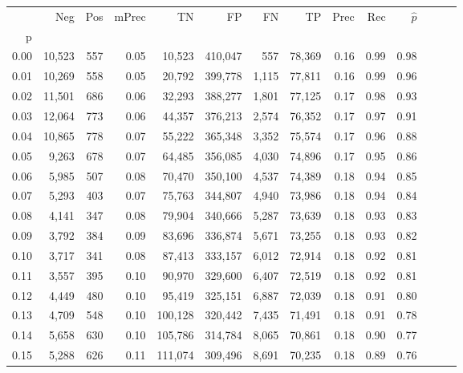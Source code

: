 \begin{tabular}{rrrrrrrrrrrrrr}
\toprule
{} &     Neg &    Pos & mPrec &       TN &       FP &      FN &      TP &  Prec &   Rec & $\hat{p}$ \\
p    &         &        &       &          &          &         &         &       &       &           \\
\midrule
0.00 &  10,523 &    557 &  0.05 &   10,523 &  410,047 &     557 &  78,369 &  0.16 &  0.99 &      0.98 \\
0.01 &  10,269 &    558 &  0.05 &   20,792 &  399,778 &   1,115 &  77,811 &  0.16 &  0.99 &      0.96 \\
0.02 &  11,501 &    686 &  0.06 &   32,293 &  388,277 &   1,801 &  77,125 &  0.17 &  0.98 &      0.93 \\
0.03 &  12,064 &    773 &  0.06 &   44,357 &  376,213 &   2,574 &  76,352 &  0.17 &  0.97 &      0.91 \\
0.04 &  10,865 &    778 &  0.07 &   55,222 &  365,348 &   3,352 &  75,574 &  0.17 &  0.96 &      0.88 \\
0.05 &   9,263 &    678 &  0.07 &   64,485 &  356,085 &   4,030 &  74,896 &  0.17 &  0.95 &      0.86 \\
0.06 &   5,985 &    507 &  0.08 &   70,470 &  350,100 &   4,537 &  74,389 &  0.18 &  0.94 &      0.85 \\
0.07 &   5,293 &    403 &  0.07 &   75,763 &  344,807 &   4,940 &  73,986 &  0.18 &  0.94 &      0.84 \\
0.08 &   4,141 &    347 &  0.08 &   79,904 &  340,666 &   5,287 &  73,639 &  0.18 &  0.93 &      0.83 \\
0.09 &   3,792 &    384 &  0.09 &   83,696 &  336,874 &   5,671 &  73,255 &  0.18 &  0.93 &      0.82 \\
0.10 &   3,717 &    341 &  0.08 &   87,413 &  333,157 &   6,012 &  72,914 &  0.18 &  0.92 &      0.81 \\
0.11 &   3,557 &    395 &  0.10 &   90,970 &  329,600 &   6,407 &  72,519 &  0.18 &  0.92 &      0.81 \\
0.12 &   4,449 &    480 &  0.10 &   95,419 &  325,151 &   6,887 &  72,039 &  0.18 &  0.91 &      0.80 \\
0.13 &   4,709 &    548 &  0.10 &  100,128 &  320,442 &   7,435 &  71,491 &  0.18 &  0.91 &      0.78 \\
0.14 &   5,658 &    630 &  0.10 &  105,786 &  314,784 &   8,065 &  70,861 &  0.18 &  0.90 &      0.77 \\
0.15 &   5,288 &    626 &  0.11 &  111,074 &  309,496 &   8,691 &  70,235 &  0.18 &  0.89 &      0.76 \\

\end{tabular}

